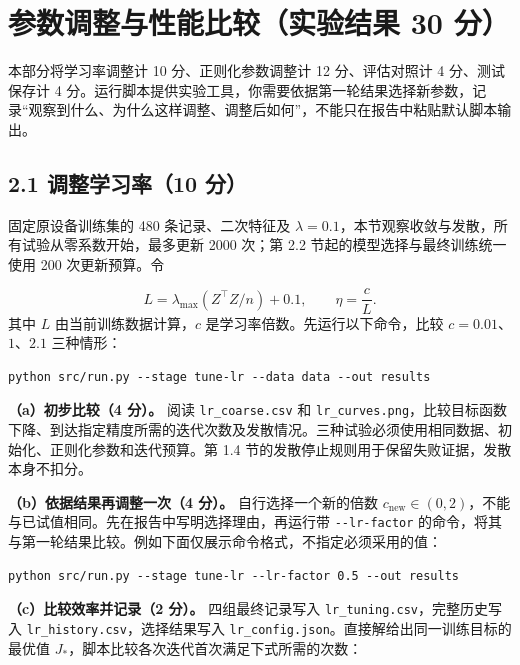 \documentclass[11pt,a4paper]{article}
\newcommand{\code}[1]{{\small\nolinkurl{#1}}}
\begin{document}
\section{参数调整与性能比较（实验结果 30 分）}
本部分将学习率调整计 10 分、正则化参数调整计 12 分、评估对照计 4 分、测试保存计 4 分。运行脚本提供实验工具，你需要依据第一轮结果选择新参数，记录“观察到什么、为什么这样调整、调整后如何”，不能只在报告中粘贴默认脚本输出。


\subsection*{2.1 调整学习率（10 分）}
固定原设备训练集的 480 条记录、二次特征及 $\lambda=0.1$，本节观察收敛与发散，所有试验从零系数开始，最多更新 2000 次；第 2.2 节起的模型选择与最终训练统一使用 200 次更新预算。令


\[
L=\lambda_{\max}(Z^\top Z/n)+0.1,\qquad \eta=\frac{c}{L}.
\]
其中 $L$ 由当前训练数据计算，$c$ 是学习率倍数。先运行以下命令，比较 $c=0.01$、$1$、$2.1$ 三种情形：


\par{}\noindent\begin{minipage}{\linewidth}
\begin{lstlisting}[aboveskip=0pt,belowskip=0pt]
python src/run.py --stage tune-lr --data data --out results
\end{lstlisting}
\end{minipage}\par{}
\textbf{（a）初步比较（4 分）。} 阅读 \code{lr_coarse.csv} 和 \code{lr_curves.png}，比较目标函数下降、到达指定精度所需的迭代次数及发散情况。三种试验必须使用相同数据、初始化、正则化参数和迭代预算。第 1.4 节的发散停止规则用于保留失败证据，发散本身不扣分。

\textbf{（b）依据结果再调整一次（4 分）。} 自行选择一个新的倍数 $c_{\mathrm{new}}\in(0,2)$，不能与已试值相同。先在报告中写明选择理由，再运行带 \code{--lr-factor} 的命令，将其与第一轮结果比较。例如下面仅展示命令格式，不指定必须采用的值：


\par{}\noindent\begin{minipage}{\linewidth}
\begin{lstlisting}[aboveskip=0pt,belowskip=0pt]
python src/run.py --stage tune-lr --lr-factor 0.5 --out results
\end{lstlisting}
\end{minipage}\par{}
\textbf{（c）比较效率并记录（2 分）。} 四组最终记录写入 \code{lr_tuning.csv}，完整历史写入 \code{lr_history.csv}，选择结果写入 \code{lr_config.json}。直接解给出同一训练目标的最优值 $J_*$，脚本比较各次迭代首次满足下式所需的次数：
\end{document}
